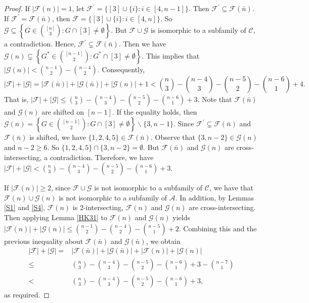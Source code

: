 \documentclass[11pt]{article}
\numberwithin{equation}{section}
\begin{document}
\begin{proof}
If $|\mathcal{F}(n)|=1$, let $\mathcal{F}^{\prime}=\{[3]\cup\{i\}: i\in [4, n-1]\}$. Then $\mathcal{F}^{\prime}\subseteq\mathcal{F}(\bar{n})$. If $\mathcal{F}^{\prime}=\mathcal{F}(\bar{n})$, then $\mathcal{F}=\{[3]\cup\{i\}: i\in [4, n]\}$. So $\mathcal{G} \subseteq\left\{G \in\binom{[n]}{3}: G\cap[3] \neq \emptyset\right\}$. But $\mathcal{F}\cup \mathcal{G}$ is isomorphic to a subfamily of $\mathcal{C}$, a contradiction.
Hence, $\mathcal{F}^{\prime}\subsetneq \mathcal{F}(\bar{n})$. Then we have $\mathcal{G}(n) \subsetneq\left\{G^*\in\binom{[n-1]}{2}: G^*\cap[3] \neq \emptyset\right\}$. This implies that
$
|\mathcal{G}(n)| <\binom{n-1}{2}-\binom{n-4}{2}.
$
Consequently,
$$
|\mathcal{F}|+|\mathcal{G}|=|\mathcal{F}(\bar{n})|+|\mathcal{G}(\bar{n})|+|\mathcal{G}(n)|+1 <\binom{n}{3}-\binom{n-4}{3}-\binom{n-5}{2}-\binom{n-6}{1}+4.
$$
That is, $
|\mathcal{F}|+|\mathcal{G}| \leq\binom{n}{3}-\binom{n-4}{3}-\binom{n-5}{2}-\binom{n-6}{1}+3.$
Note that $\mathcal{F}(\bar{n})$ and $\mathcal{G}(n)$ are shifted on $[n-1]$. If the equality holds, then $\mathcal{G}(n)=\left\{G \in\binom{[n-1]}{2}: G\cap[3] \neq \emptyset\right\}\backslash \{3,n-1\}.$
Since $\mathcal{F}^{\prime}\subsetneq\mathcal{F}(\bar{n})$ and $\mathcal{F}(\bar{n})$  is  shifted, we have $\{1,2,4, 5\}\in \mathcal{F}(\bar{n})$. Observe that $\{3,n-2\}\in \mathcal{G}(n)$ and $n-2\geq 6$. So $\{1,2,4, 5\}\cap\{3,n-2\}=\emptyset$. But $\mathcal{F}(\bar{n})$ and $\mathcal{G}(n)$ are cross-intersecting, a contradiction. Therefore, we have $
|\mathcal{F}|+|\mathcal{G}| <\binom{n}{3}-\binom{n-4}{3}-\binom{n-5}{2}-\binom{n-6}{1}+3.
$

If $|\mathcal{F}(n)|\geq 2$, since $\mathcal{F}\cup \mathcal{G}$ is not isomorphic to a subfamily of $\mathcal{C}$, we have that  $\mathcal{F}(n)\cup \mathcal{G}(n)$ is not isomorphic to a subfamily of $\mathcal{A}$. In addition, by Lemmas \ref{S1} and \ref{S4}, $\mathcal{F}(n)$ is $2$-intersecting, $\mathcal{F}(n)$ and $\mathcal{G}(n)$ are cross-intersecting.  Then applying Lemma \ref{HK31} to $\mathcal{F}(n)$ and $\mathcal{G}(n)$ yields
$
|\mathcal{F}(n)|+|\mathcal{G}(n)| \leq\binom{n-1}{2}-\binom{n-4}{2}-\binom{n-5}{1}+2.
$
Combining this and the previous inequality about $\mathcal{F}(\bar{n})$ and $\mathcal{G}(\bar{n})$, we obtain
\begin{align*}
|\mathcal{F}|+|\mathcal{G}|=&|\mathcal{F}(\bar{n})|+|\mathcal{G}(\bar{n})|+|\mathcal{F}(n)|+|\mathcal{G}(n)|\\
\leq&\binom{n}{3}-\binom{n-4}{3}-\binom{n-5}{2}-\binom{n-6}{1}+3-\binom{n-7}{1}\\
<&\binom{n}{3}-\binom{n-4}{3}-\binom{n-5}{2}-\binom{n-6}{1}+3,
\end{align*}
as required.
\end{proof}
\end{document}

